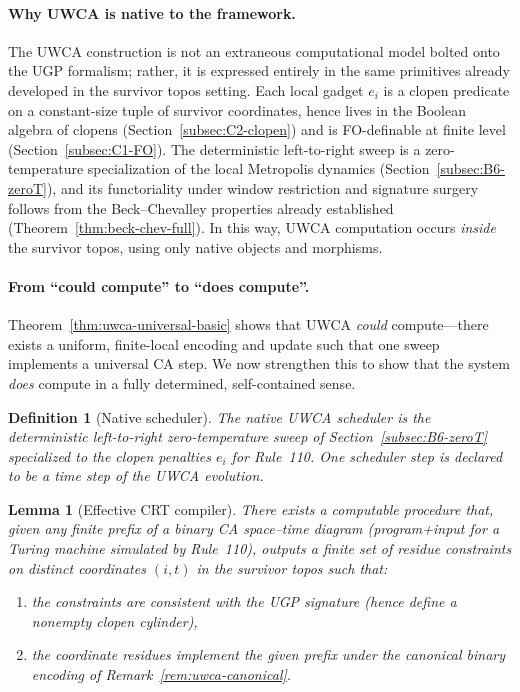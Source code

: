 \documentclass[12pt]{article}
\newtheorem{lemma}[theorem]{Lemma}
\newtheorem{definition}[theorem]{Definition}
\numberwithin{equation}{section}
\begin{document}
\paragraph{Why UWCA is native to the framework.}
The UWCA construction is not an extraneous computational model bolted onto the UGP formalism; rather, it is expressed entirely in the same primitives already developed in the survivor topos setting. Each local gadget $e_i$ is a clopen predicate on a constant-size tuple of survivor coordinates, hence lives in the Boolean algebra of clopens (Section~\ref{subsec:C2-clopen}) and is FO-definable at finite level (Section~\ref{subsec:C1-FO}). The deterministic left-to-right sweep is a zero-temperature specialization of the local Metropolis dynamics (Section~\ref{subsec:B6-zeroT}), and its functoriality under window restriction and signature surgery follows from the Beck--Chevalley properties already established (Theorem~\ref{thm:beck-chev-full}). In this way, UWCA computation occurs \emph{inside} the survivor topos, using only native objects and morphisms.


\paragraph{From ``could compute'' to ``does compute''.}
Theorem~\ref{thm:uwca-universal-basic} shows that UWCA \emph{could} compute---there exists a uniform, finite-local encoding and update such that one sweep implements a universal CA step. We now strengthen this to show that the system \emph{does} compute in a fully determined, self-contained sense.

\begin{definition}[Native scheduler]
The \emph{native UWCA scheduler} is the deterministic left-to-right zero-temperature sweep of Section~\ref{subsec:B6-zeroT} specialized to the clopen penalties $e_i$ for Rule~110. One scheduler step is declared to be a \emph{time step} of the UWCA evolution.
\end{definition}

\begin{lemma}[Effective CRT compiler]
There exists a computable procedure that, given any finite prefix of a binary CA space--time diagram (program+input for a Turing machine simulated by Rule~110), outputs a finite set of residue constraints on distinct coordinates $(i,t)$ in the survivor topos such that:
\begin{enumerate}[label=(\arabic*), itemsep=1pt]
\item the constraints are consistent with the UGP signature (hence define a nonempty clopen cylinder),
\item the coordinate residues implement the given prefix under the canonical binary encoding of Remark~\ref{rem:uwca-canonical}.
\end{enumerate}
\end{lemma}
\end{document}
